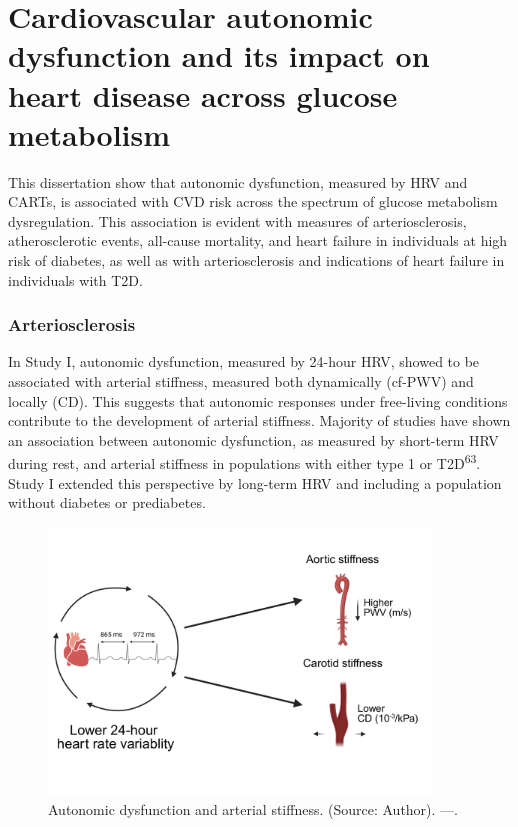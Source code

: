 \documentclass[
  a4paper,
  headsepline=true,
  open=any]{scrbook}
\begin{document}
\hypertarget{cardiovascular-autonomic-dysfunction-and-its-impact-on-heart-disease-across-glucose-metabolism}{%
\section{Cardiovascular autonomic dysfunction and its impact on heart
disease across glucose
metabolism}\label{cardiovascular-autonomic-dysfunction-and-its-impact-on-heart-disease-across-glucose-metabolism}}

This dissertation show that autonomic dysfunction, measured by HRV and
CARTs, is associated with CVD risk across the spectrum of glucose
metabolism dysregulation. This association is evident with measures of
arteriosclerosis, atherosclerotic events, all-cause mortality, and heart
failure in individuals at high risk of diabetes, as well as with
arteriosclerosis and indications of heart failure in individuals with
T2D.

\hypertarget{arteriosclerosis-1}{%
\subsubsection{Arteriosclerosis}\label{arteriosclerosis-1}}

In Study I, autonomic dysfunction, measured by 24-hour HRV, showed to be
associated with arterial stiffness, measured both dynamically (cf-PWV)
and locally (CD). This suggests that autonomic responses under
free-living conditions contribute to the development of arterial
stiffness. Majority of studies have shown an association between
autonomic dysfunction, as measured by short-term HRV during rest, and
arterial stiffness in populations with either type 1 or
T2D\textsuperscript{63}. Study I extended this perspective by long-term
HRV and including a population without diabetes or prediabetes.

\begin{figure}

{\centering \includegraphics[width=4in,height=\textheight]{images/hrv_arterial_stiffness.pdf}

}

\caption{Autonomic dysfunction and arterial stiffness. (Source: Author).
---.}

\end{figure}
\end{document}
